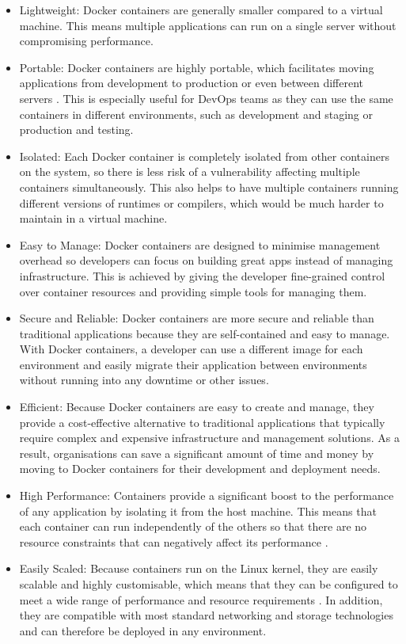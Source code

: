 \documentclass[BIF,Master,nenglish]{twbook}%
\begin{document}
\begin{itemize}
\item Lightweight: Docker containers are generally smaller compared to a virtual machine. This means multiple applications can run on a single server without compromising performance.\cite{vmwcovsvm}

\item Portable: Docker containers are highly portable, which facilitates moving applications from development to production or even between different servers \cite{rad2017}. This is especially useful for DevOps teams as they can use the same containers in different environments, such as development and staging or production and testing.

\item Isolated: Each Docker container is completely isolated from other containers on the system, so there is less risk of a vulnerability affecting multiple containers simultaneously.\cite{com2016} This also helps to have multiple containers running different versions of runtimes or compilers, which would be much harder to maintain in a virtual machine.

\item Easy to Manage: Docker containers are designed to minimise management overhead so developers can focus on building great apps instead of managing infrastructure. This is achieved by giving the developer fine-grained control over container resources and providing simple tools for managing them. 

\item Secure and Reliable: Docker containers are more secure and reliable than traditional applications because they are self-contained and easy to manage. With Docker containers, a developer can use a different image for each environment and easily migrate their application between environments without running into any downtime or other issues. 

\item Efficient: Because Docker containers are easy to create and manage, they provide a cost-effective alternative to traditional applications that typically require complex and expensive infrastructure and management solutions. As a result, organisations can save a significant amount of time and money by moving to Docker containers for their development and deployment needs. 

\item High Performance: Containers provide a significant boost to the performance of any application by isolating it from the host machine. This means that each container can run independently of the others so that there are no resource constraints that can negatively affect its performance \cite{rad2017}.

\item Easily Scaled: Because containers run on the Linux kernel, they are easily scalable and highly customisable, which means that they can be configured to meet a wide range of performance and resource requirements \cite{rad2017}. In addition, they are compatible with most standard networking and storage technologies and can therefore be deployed in any environment. 
\end{itemize}
\end{document}
